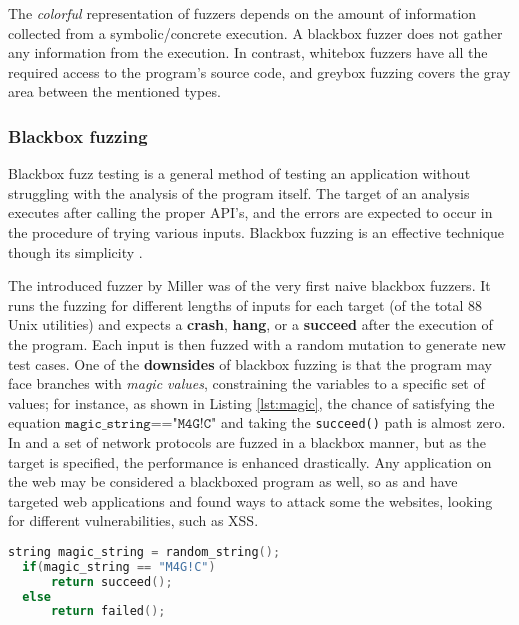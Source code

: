 The \textit{colorful} representation of fuzzers depends on the amount of information collected from a symbolic/concrete execution. A blackbox fuzzer does not gather any information from the execution. In contrast, whitebox fuzzers have all the required access to the program's source code, and greybox fuzzing covers the gray area between the mentioned types.

\subsubsection{Blackbox fuzzing}

Blackbox fuzz testing is a general method of testing an application without struggling with the analysis of the program itself. The target of an analysis executes after calling the proper API's, and the errors are expected to occur in the procedure of trying various inputs. Blackbox fuzzing is an effective technique though its simplicity \cite{woo2013scheduling}.

The introduced fuzzer by Miller \cite{miller1990empirical} was of the very first naive blackbox fuzzers. It runs the fuzzing for different lengths of inputs for each target (of the total 88 Unix utilities) and expects a \textbf{crash}, \textbf{hang}, or a \textbf{succeed} after the execution of the program. Each input is then fuzzed with a random mutation to generate new test cases. One of the \textbf{downsides} of blackbox fuzzing is that the program may face branches with \textit{magic values}, constraining the variables to a specific set of values; for instance, as shown in Listing \ref{lst:magic}, the chance of satisfying the equation $\texttt{magic\_string=="M4G!C"}$ and taking the \texttt{succeed()} path is almost zero. In \cite{banks2006snooze} and \cite{gascon2015pulsar} a set of network protocols are fuzzed in a blackbox manner, but as the target is specified, the performance is enhanced drastically. Any application on the web may be considered a blackboxed program as well, so as \cite{doupe2012enemy} and \cite{duchene2012xss} have targeted web applications and found ways to attack some the websites, looking for different vulnerabilities, such as XSS.

\begin{lstlisting}[language=C++,style=CodeStyle,caption=Magic Value: \texttt{M4G!C} is a magic value,label={lst:magic}]
  string magic_string = random_string();
  if(magic_string == "M4G!C")
      return succeed();
  else
      return failed();
\end{lstlisting}

